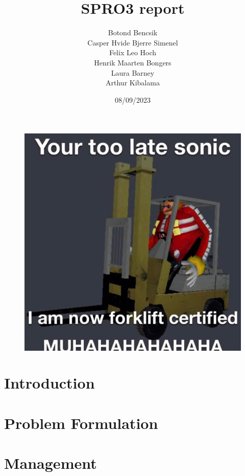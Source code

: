 \documentclass[11pt,table]{article}
\title{SPRO3 report}
\date{08/09/2023}
\author{Botond Bencsik\\Casper Hvide Bjerre Simenel\\Felix Leo Hoch\\Henrik Maarten Bongers\\Laura Barney\\Arthur Kibalama}
\begin{document}
\maketitle
\begin{figure}[H]
    \includegraphics[width=\textwidth]{forklift_m.jpg}
\end{figure}
\newpage
\tableofcontents
\newpage
\section{Introduction}
      
\section{Problem Formulation}
    
    
    

    
\section{Management}
    
    
\end{document}
